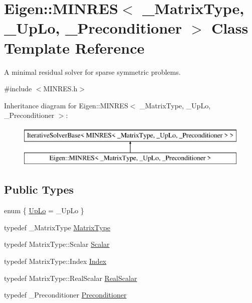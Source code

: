 \hypertarget{class_eigen_1_1_m_i_n_r_e_s}{}\section{Eigen\+:\+:M\+I\+N\+R\+E\+S$<$ \+\_\+\+Matrix\+Type, \+\_\+\+Up\+Lo, \+\_\+\+Preconditioner $>$ Class Template Reference}
\label{class_eigen_1_1_m_i_n_r_e_s}


A minimal residual solver for sparse symmetric problems.  




{\ttfamily \#include $<$M\+I\+N\+R\+E\+S.\+h$>$}

Inheritance diagram for Eigen\+:\+:M\+I\+N\+R\+E\+S$<$ \+\_\+\+Matrix\+Type, \+\_\+\+Up\+Lo, \+\_\+\+Preconditioner $>$\+:\begin{figure}[H]
\begin{center}
\leavevmode
\includegraphics[height=2.000000cm]{class_eigen_1_1_m_i_n_r_e_s}
\end{center}
\end{figure}
\subsection*{Public Types}
\begin{DoxyCompactItemize}
\item 
enum \{ \hyperlink{class_eigen_1_1_m_i_n_r_e_s_ad8c4b34431942a17a145a5a602178812a2fc247046ae2082cb2c3d14b3fa5e774}{Up\+Lo} = \+\_\+\+Up\+Lo
 \}
\item 
typedef \+\_\+\+Matrix\+Type \hyperlink{class_eigen_1_1_m_i_n_r_e_s_a8ce71aa3d9a30f0b6e87e5e96555c4c1}{Matrix\+Type}
\item 
typedef Matrix\+Type\+::\+Scalar \hyperlink{class_eigen_1_1_m_i_n_r_e_s_ac6a380b335865e7ff16d00ef62e48389}{Scalar}
\item 
typedef Matrix\+Type\+::\+Index \hyperlink{class_eigen_1_1_m_i_n_r_e_s_a572236e313bd4bbaec98ba2a79040854}{Index}
\item 
typedef Matrix\+Type\+::\+Real\+Scalar \hyperlink{class_eigen_1_1_m_i_n_r_e_s_afaba94a663df1db559845456b5f50d5c}{Real\+Scalar}
\item 
typedef \+\_\+\+Preconditioner \hyperlink{class_eigen_1_1_m_i_n_r_e_s_a6fb2cbecafdfb22a1394586753a27ed4}{Preconditioner}
\end{DoxyCompactItemize}
